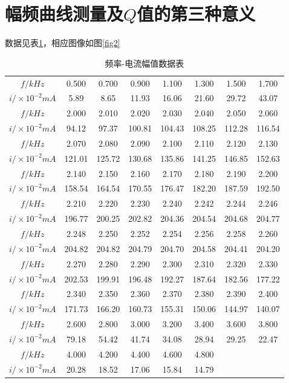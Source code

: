 \documentclass[12pt, a4paper]{ctexart}
\begin{document}
\section{幅频曲线测量及$Q$值的第三种意义}
数据见表\ref{tab:t2}，相应图像如图\ref{fig2}
\begin{table}[htbp]
  \centering
  \caption{频率-电流幅值数据表}
    \begin{tabular}{c|ccccccc}
    \toprule
    $f/kHz$ & 0.500  & 0.700 & 0.900 & 1.100 & 1.300 & 1.500 & 1.700 \\
    $i / \times 10^{-2} mA$ & 5.89 & 8.65 & 11.93 & 16.06 & 21.60 & 29.72 & 43.07 \\
    \midrule
    $f/kHz$ & 2.000  & 2.010 & 2.020 & 2.030 & 2.040 & 2.050 & 2.060 \\
    $i / \times 10^{-2} mA$ & 94.12 & 97.37 & 100.81 & 104.43 & 108.25 & 112.28 & 116.54 \\
    \midrule
    $f/kHz$ & 2.070 & 2.080 & 2.090 & 2.100 & 2.110 & 2.120 & 2.130 \\
    $i / \times 10^{-2} mA$ & 121.01 & 125.72 & 130.68 & 135.86 & 141.25 & 146.85 & 152.63\\
    \midrule
    $f/kHz$ & 2.140 & 2.150 & 2.160 & 2.170 & 2.180 & 2.190 & 2.200 \\
    $i / \times 10^{-2} mA$ & 158.54 & 164.54 & 170.55 & 176.47 & 182.20 & 187.59 & 192.50 \\
    \midrule
    $f/kHz$ & 2.210 & 2.220 & 2.230 & 2.240 & 2.242 & 2.244 & 2.246 \\
    $i / \times 10^{-2} mA$ & 196.77 & 200.25 & 202.82 & 204.36 & 204.54 & 204.68 & 204.77 \\
    \midrule
    $f/kHz$ & 2.248 & 2.250 & 2.252 & 2.254 & 2.256 & 2.258 & 2.260 \\
    $i / \times 10^{-2} mA$ & 204.82 & 204.82 & 204.79 & 204.70 & 204.58 & 204.41 & 204.20 \\
    \midrule
    $f/kHz$ & 2.270 & 2.280 & 2.290 & 2.300 & 2.310 & 2.320 & 2.330 \\
    $i / \times 10^{-2} mA$ & 202.53 & 199.91 & 196.48 & 192.27 & 187.64 & 182.56 & 177.22 \\
    \midrule
    $f/kHz$ & 2.340 & 2.350 & 2.360 & 2.370 & 2.380 & 2.390 & 2.400 \\
    $i / \times 10^{-2} mA$ & 171.73 & 166.20 & 160.73 & 155.31 & 150.06 & 144.97 & 140.07 \\
    \midrule
    $f/kHz$ & 2.600 & 2.800 & 3.000 & 3.200 & 3.400 & 3.600 & 3.800 \\
    $i / \times 10^{-2} mA$ & 79.18 & 54.42 & 41.74 & 34.08 & 28.94 & 29.25 & 22.47 \\
    \midrule
    $f/kHz$ & 4.000 & 4.200 & 4.400 & 4.600 & 4.800 &   &   \\
    $i / \times 10^{-2} mA$ & 20.28 & 18.52 & 17.06 & 15.84 & 14.79 &   &   \\
    \bottomrule
    \end{tabular}
  \label{tab:t2}
\end{table}
\end{document}
